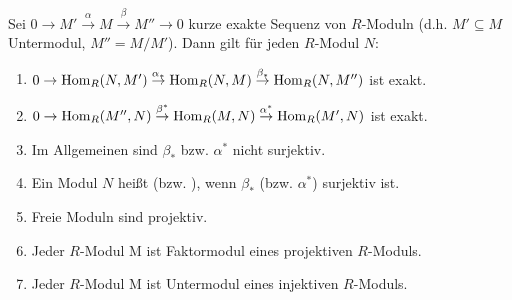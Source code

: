 \documentclass[a4paper, 10pt]{report}
\begin{document}
\begin{PropDef}
  Sei $0 \to M' \overset{\alpha}{\to} M \overset{\beta}{\to} M'' \to 0$ kurze exakte Sequenz von $R$-Moduln (d.h.
  $M' \subseteq M$ Untermodul, $M'' = M/M'$). Dann gilt für jeden $R$-Modul $N$:
  \begin{enumerate}
    \item $0 \to \Hom[R]{N}{M'} \overset{\alpha_*}{\to} \Hom[R]{N}{M} \overset{\beta_*}{\to}
          \Hom[R]{N}{M''}$ ist exakt.
    \item $0 \to \Hom[R]{M''}{N} \overset{\beta^*}{\to} \Hom[R]{M}{N} \overset{\alpha^*}{\to}
          \Hom[R]{M'}{N}$ ist exakt.
    \item Im Allgemeinen sind $\beta_*$ bzw. $\alpha^*$ nicht surjektiv.
    \item Ein Modul $N$ heißt  (bzw.
          ), wenn $\beta_*$ (bzw.
          $\alpha^*$) surjektiv ist.
    \item Freie Moduln sind projektiv.
    \item Jeder $R$-Modul M ist Faktormodul eines projektiven $R$-Moduls.
    \item Jeder $R$-Modul M ist Untermodul eines injektiven $R$-Moduls.
  \end{enumerate}
\end{PropDef}
\end{document}
